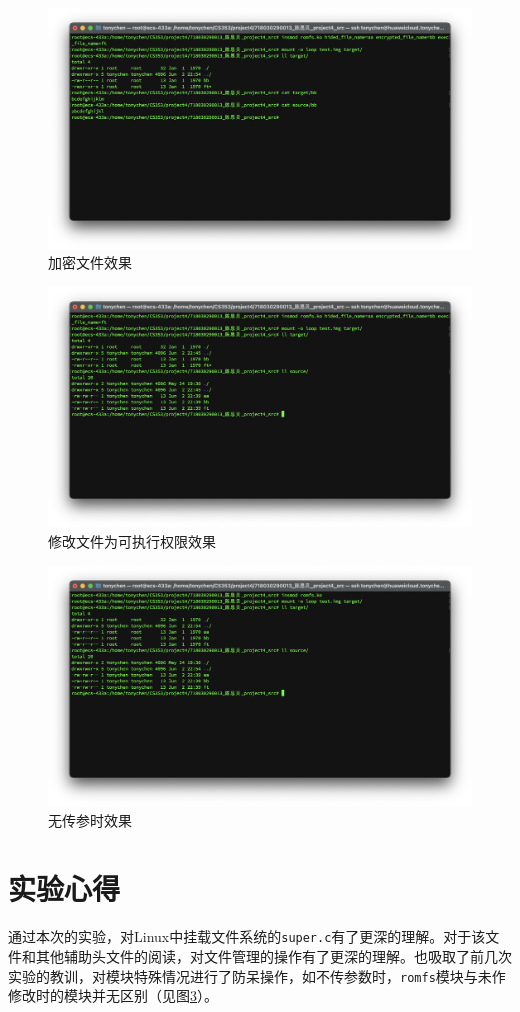 \documentclass[UTF8]{ctexrep}
\begin{document}
    \begin{figure}[h!]
        \centering
        \includegraphics[width=15cm,keepaspectratio]{images/part2.png}
        \caption{加密文件效果}
        \label{fig:part2}
    \end{figure}

    \begin{figure}[h!]
        \centering
        \includegraphics[width=15cm,keepaspectratio]{images/part3.png}
        \caption{修改文件为可执行权限效果}
        \label{fig:part3}
    \end{figure}

    \begin{figure}[h!]
        \centering
        \includegraphics[width=15cm,keepaspectratio]{images/nochg.png}
        \caption{无传参时效果}
        \label{fig:nochg}
    \end{figure}
    

    \section{实验心得}
    通过本次的实验，对Linux中挂载文件系统的\texttt{super.c}有了更深的理解。对于该文件和其他辅助头文件的阅读，对文件管理的操作有了更深的理解。也吸取了前几次实验的教训，对模块特殊情况进行了防呆操作，如不传参数时，\texttt{romfs}模块与未作修改时的模块并无区别（见图\ref{fig:nochg}）。
\end{document}
